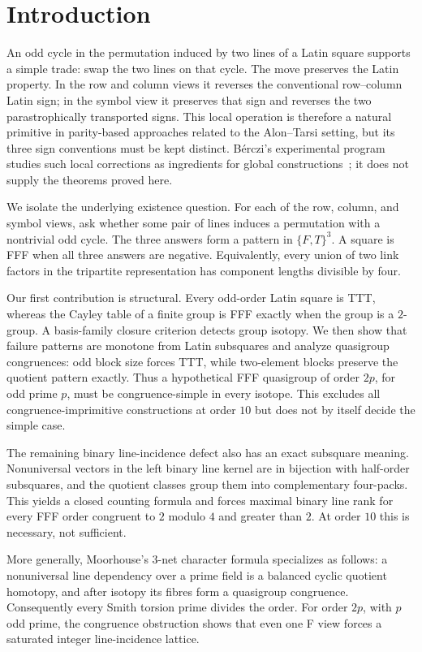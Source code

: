 \section{Introduction}

An odd cycle in the permutation induced by two lines of a Latin square
supports a simple trade: swap the two lines on that cycle.  The move preserves
the Latin property.  In the row and column views it reverses the conventional
row--column Latin sign; in the symbol view it preserves that sign and reverses
the two parastrophically transported signs.  This local operation is therefore
a natural primitive in parity-based approaches related to the Alon--Tarsi
setting, but its three sign conventions must be kept distinct.  B\'erczi's
experimental program studies such local corrections as ingredients for
global constructions~\cite{Berczi2026}; it does not supply the theorems proved
here.

We isolate the underlying existence question.  For each of the row, column,
and symbol views, ask whether some pair of lines induces a permutation with a
nontrivial odd cycle.  The three answers form a pattern in $\{F,T\}^3$.  A
square is FFF when all three answers are negative.  Equivalently, every union
of two link factors in the tripartite representation has component lengths
divisible by four.

Our first contribution is structural.  Every odd-order Latin square is TTT,
whereas the Cayley table of a finite group is FFF exactly when the group is a
$2$-group.  A basis-family closure criterion detects group isotopy.  We then
show that failure patterns are monotone from Latin subsquares and analyze
quasigroup congruences: odd block size forces TTT, while two-element blocks
preserve the quotient pattern exactly.  Thus a hypothetical FFF quasigroup of
order $2p$, for odd prime $p$, must be congruence-simple in every isotope.
This excludes all congruence-imprimitive constructions at order $10$ but does
not by itself decide the simple case.

The remaining binary line-incidence defect also has an exact subsquare
meaning.  Nonuniversal vectors in the left binary line kernel are in
bijection with half-order subsquares, and the quotient classes group them
into complementary four-packs.  This yields a closed counting formula and
forces maximal binary line rank for every FFF order congruent to $2$ modulo
$4$ and greater than $2$.  At order $10$ this is necessary, not sufficient.

More generally, Moorhouse's $3$-net character formula specializes as follows:
a nonuniversal line dependency over a prime field is a
balanced cyclic quotient homotopy, and after isotopy its fibres form a
quasigroup congruence.  Consequently every Smith torsion prime divides the
order.  For order $2p$, with $p$ odd prime, the congruence obstruction shows
that even one F view forces a saturated integer line-incidence lattice.


